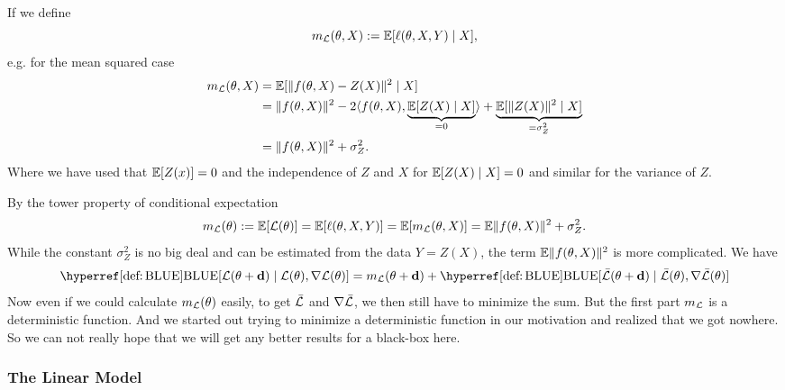 If we define
\begin{equation*}
	m_{\mathcal{L}}(\theta, X):= \mathbb{E}[\ell(\theta, X,Y)\mid X],
\end{equation*}
e.g. for the mean squared case
\begin{align*}
	m_{\mathcal{L}}(\theta, X)&= \mathbb{E}[\|f(\theta, X)-Z(X)\|^2 \mid X]\\
	&= \|f(\theta, X)\|^2 - 2\langle f(\theta, X), \underbrace{\mathbb{E}[Z(X)\mid X]}_{=0}\rangle
	+ \underbrace{\mathbb{E}[\|Z(X)\|^2\mid X]}_{=\sigma_Z^2}\\
	&= \|f(\theta, X)\|^2 + \sigma_Z^2.
\end{align*}
Where we have used that \(\mathbb{E}[Z(x)]=0\) and the independence of \(Z\) and \(X\)
for \(\mathbb{E}[Z(X)\mid X]=0\) and similar for the variance of \(Z\).

By the tower property of conditional expectation
\begin{equation*}
	m_{\mathcal{L}}(\theta) := \mathbb{E}[\mathcal{L}(\theta)]
	= \mathbb{E}[\ell(\theta, X,Y)]
	= \mathbb{E}[m_{\mathcal{L}}(\theta, X)]
	= \mathbb{E}\|f(\theta, X)\|^2 + \sigma_Z^2.
\end{equation*}
While the constant \(\sigma_Z^2\) is no big deal and can be estimated from the
data \(Y=Z(X)\), the term \(\mathbb{E}\|f(\theta, X)\|^2\) is more complicated. We have
\begin{equation*}
	\BLUE[\Loss(\param+\step)\mid \Loss(\param),\grad\Loss(\param)]
	= m_\Loss(\param+\step)
	+ \BLUE[\bar{\Loss}(\param+\step)\mid \bar{\Loss}(\param), \grad\bar{\Loss}(\param)]
\end{equation*}
Now even if we could calculate \(m_{\mathcal{L}}(\theta)\) easily, to get \(\bar{\mathcal{L}}\)
and \(\nabla\bar{\mathcal{L}}\), we then still have to minimize the sum. But the first
part \(m_{\mathcal{L}}\) is a deterministic function. And we started out trying to minimize
a deterministic function in our motivation and realized that we got nowhere. So
we can not really hope that we will get any better results for a black-box here.

\subsubsection{The Linear Model}

